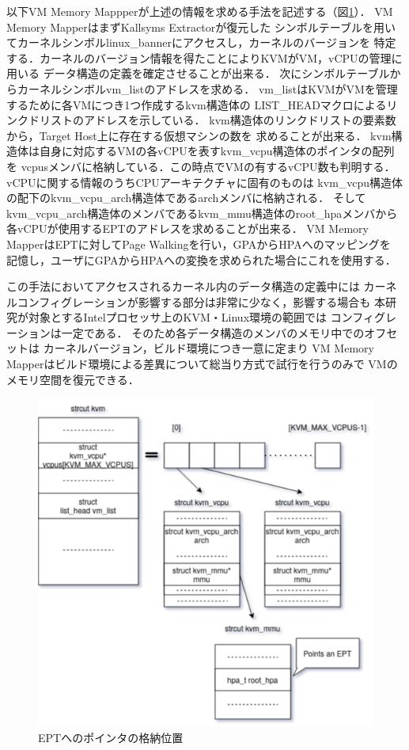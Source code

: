 以下VM Memory Mappperが上述の情報を求める手法を記述する（図\ref{fig:ept_pointer}）．
VM Memory MapperはまずKallsyms Extractorが復元した
シンボルテーブルを用いてカーネルシンボルlinux\_bannerにアクセスし，カーネルのバージョンを
特定する．カーネルのバージョン情報を得たことによりKVMがVM，vCPUの管理に用いる
データ構造の定義を確定させることが出来る．
次にシンボルテーブルからカーネルシンボルvm\_listのアドレスを求める．
vm\_listはKVMがVMを管理するために各VMにつき1つ作成するkvm構造体の
LIST\_HEADマクロによるリンクドリストのアドレスを示している．
kvm構造体のリンクドリストの要素数から，Target Host上に存在する仮想マシンの数を
求めることが出来る．
kvm構造体は自身に対応するVMの各vCPUを表すkvm\_vcpu構造体のポインタの配列を
vcpusメンバに格納している．この時点でVMの有するvCPU数も判明する．
vCPUに関する情報のうちCPUアーキテクチャに固有のものは
kvm\_vcpu構造体の配下のkvm\_vcpu\_arch構造体であるarchメンバに格納される．
そしてkvm\_vcpu\_arch構造体のメンバであるkvm\_mmu構造体のroot\_hpaメンバから
各vCPUが使用するEPTのアドレスを求めることが出来る．
VM Memory MapperはEPTに対してPage Walkingを行い，GPAからHPAへのマッピングを
記憶し，ユーザにGPAからHPAへの変換を求められた場合にこれを使用する．

この手法においてアクセスされるカーネル内のデータ構造の定義中には
カーネルコンフィグレーションが影響する部分は非常に少なく，影響する場合も
本研究が対象とするIntelプロセッサ上のKVM・Linux環境の範囲では
コンフィグレーションは一定である．
そのため各データ構造のメンバのメモリ中でのオフセットは
カーネルバージョン，ビルド環境につき一意に定まり
VM Memory Mapperはビルド環境による差異について総当り方式で試行を行うのみで
VMのメモリ空間を復元できる．


\begin{figure}[h]
  \includegraphics[scale=0.45]{ept_pointer.png}
  \caption{EPTへのポインタの格納位置}
  \label{fig:ept_pointer}
\end{figure}
